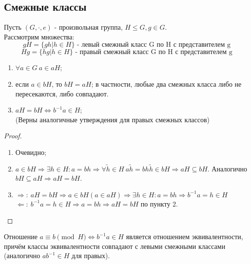 \subsection{Смежные классы}
\begin{definition}
    Пусть $(G, \cdot, e)$ - произвольная группа, $H \leq G, g \in G$.\\
    Рассмотрим множества:
    \[gH = \{gh | h \in H\} \text{ - левый смежный класс G по H с представителем g}\]
    \[Hg = \{hg | h \in H\} \text{ - правый смежный класс G по H с представителем g}\]
\end{definition}
\begin{subtheorem} \tab
    \begin{enumerate}
        \item $\forall a \in G \ a \in aH$;
        \item если $a \in bH$, то $bH = aH$; в частности, любые два смежных класса либо не пересекаются, либо совпадают.
        \item $aH = bH \Longleftrightarrow b^{-1}a \in H$;\\
        (Верны аналогичные утверждения для правых смежных классов)
    \end{enumerate}
\end{subtheorem}
\begin{proof} \tab
    \begin{enumerate}
        \item Очевидно;
        \item $a \in bH \Longrightarrow \exists h \in H: a = bh \Longrightarrow \forall \tilde{h} \in H \ a\tilde{h} = bh\tilde{h} \in bH \Longrightarrow aH \subseteq bH$.
        Аналогично $bH \subseteq aH \Longrightarrow aH = bH$.
        \item $\Longrightarrow: \ aH = bH \Longrightarrow a \in bH (a \in aH) \Longrightarrow \exists h \in H: a = bh \Longrightarrow b^{-1}a = h \in H$\\
        $\Longleftarrow: \ b^{-1}a = h \in H \Longrightarrow a = bh \Longrightarrow aH = bH$ по пункту 2.
    \end{enumerate}
\end{proof}
\begin{subtheorem}
    Отношение $a\equiv b \pmod{H} \Leftrightarrow b^{-1}a\in H$ является отношением эквивалентности, причём классы эквивалентности совпадают с левыми смежными классами (аналогично $ab^{-1} \in H$ для правых).
\end{subtheorem}
